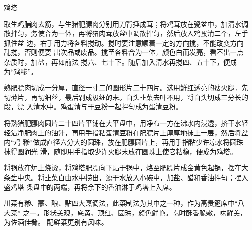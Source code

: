 \begin{recipe}[金钱鸡塔]{鸡塔}

\ingredients


\preparation

\step 取生鸡脯肉去筋，与生猪肥膘肉分别用刀背捶成茸；将鸡茸放在瓷盆中，加清水调
散拌匀，务使合为一体，再将猪肉茸放盆中调散拌匀，然后放入鸡蛋清二个，左手抓住盆
边，右手用力将各料搅动。搅时要注意顺着一定的方向搅，不能改变方向乱搅，否则便要
出次品或废品。搅至各料合为一体，颜色白而发亮，看不出一点杂质时，加盐，再如前法
搅六、七十下。随后加入清水再搅四、五十下，便成为“鸡糁”。

\step 熟肥膘肉切成一分厚，直径一寸二的圆形片二十四片。选用鲜红透亮的瘦火腿，先
切薄片，再切细丝，最后剁成极细的末。白头韭菜去叶不用，将白头切成三分长的段，漂
入清水中。鸡蛋清与干豆粉一起拌匀成为蛋清豆粉。

\step 将熟猪肥膘肉圆片二十四片平铺在大平盘中，用净布一方在沸水内浸透，挤干水轻
轻沾净肥肉上的油汁，再用手指粘蛋清豆粉在肥膘片上厚厚地抹上一层，然后将盆内“鸡
糁”做成直径六分大的圆珠，放在肥膘圆片上，再用手指粘少许凉水将圆珠抹得圆润光
滑，随即用手指取少许火腿末放在圆珠上使它粘稳，便成为鸡塔。

\step 将锅放在炉上烧烫，将鸡塔肥膘向下贴于锅中，烙至肥膘片成金黄色起锅，摆在大
条盘中央。将韭菜白由水中捞出，滤干水放入小碗中，加盐、醋和香油拌匀；摆入盛鸡塔
条盘中的两端，再将余下的香油淋于鸡塔上入席。

\features

川菜有糁、蒙、酿、贴四大烹调法，此菜制法为其中之一种，作为高贵筵席中“八大菜”
之一。形状美观，底黄、顶红、圆珠，颜色鲜艳。吃时酥香脆嫩，味鲜美，为佐酒佳肴。
配鲜菜更别有风味。

\end{recipe}

